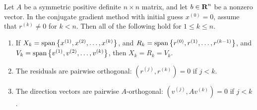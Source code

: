 \documentclass{homework}
\newcommand{\pow}[1]{^{\left(#1\right)}}
\begin{document}
	\question Let $A$ be a symmetric positive definite $n\times n$ matrix, and let $b \in \textbf{R}^n$ be a nonzero vector. In the conjugate gradient method with initial guess $x\pow{0} = 0$, assume that $r\pow{k} \ne 0$ for $k < n$. Then all of the following hold for $1\le k \le n$.
	\begin{enumerate}
		\item[(a)] If $X_k= \spn\left\{x\pow{1}, x\pow{2},\dots, x\pow{k}\right\}$, and $R_k = \spn\left\{r\pow{0}, r\pow{1}, \dots, r\pow{k-1}\right\}$, and $V_k = \spn\left\{v\pow{1}, v\pow{2}, \dots, v\pow{k}\right\}$, then $X_k = R_k = V_k$.
		\item[(b)] The residuals are pairwise orthogonal: $\left(r\pow{j}, r\pow{k}\right) = 0$ if $j < k$.
		\item[(c)] The direction vectors are pairwise $A$-orthogonal: $\left(v\pow{j}, Av\pow{k}\right) = 0$ if $j < k$.
	\end{enumerate}
	
\end{document}
